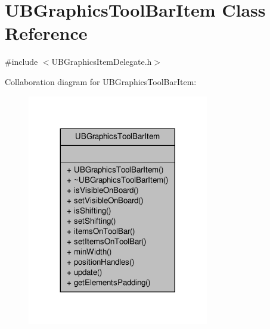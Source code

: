 \hypertarget{class_u_b_graphics_tool_bar_item}{\section{U\-B\-Graphics\-Tool\-Bar\-Item Class Reference}
\label{dd/ddb/class_u_b_graphics_tool_bar_item}
}


{\ttfamily \#include $<$U\-B\-Graphics\-Item\-Delegate.\-h$>$}



Collaboration diagram for U\-B\-Graphics\-Tool\-Bar\-Item\-:
\nopagebreak
\begin{figure}[H]
\begin{center}
\leavevmode
\includegraphics[width=224pt]{d3/d57/class_u_b_graphics_tool_bar_item__coll__graph}
\end{center}
\end{figure}
